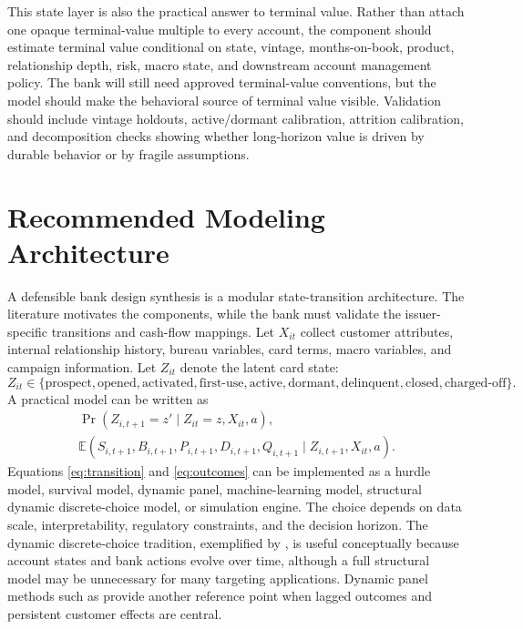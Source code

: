 \documentclass[11pt]{article}
\newcommand{\E}{\mathbb{E}}
\newcommand{\1}{\mathbf{1}}
\begin{document}
This state layer is also the practical answer to terminal value. Rather than
attach one opaque terminal-value multiple to every account, the component
should estimate terminal value conditional on state, vintage, months-on-book,
product, relationship depth, risk, macro state, and downstream account
management policy. The bank will still need approved terminal-value
conventions, but the model should make the behavioral source of terminal value
visible. Validation should include vintage holdouts, active/dormant calibration,
attrition calibration, and decomposition checks showing whether long-horizon
value is driven by durable behavior or by fragile assumptions.

\section{Recommended Modeling Architecture}
\label{sec:architecture}

A defensible bank design synthesis is a modular state-transition architecture.
The literature motivates the components, while the bank must validate the
issuer-specific transitions and cash-flow mappings. Let $X_{it}$
collect customer attributes, internal relationship history, bureau variables,
card terms, macro variables, and campaign information. Let $Z_{it}$ denote the
latent card state:
\[
  Z_{it} \in
  \{\text{prospect},\text{opened},\text{activated},\text{first-use},
    \text{active},\text{dormant},\text{delinquent},\text{closed},
    \text{charged-off}\}.
\]
A practical model can be written as
\begin{align}
  \Pr(Z_{i,t+1}=z' \mid Z_{it}=z, X_{it}, a), \label{eq:transition}\\
  \E(S_{i,t+1},B_{i,t+1},P_{i,t+1},D_{i,t+1},Q_{i,t+1}
      \mid Z_{i,t+1},X_{it},a). \label{eq:outcomes}
\end{align}
Equations \eqref{eq:transition} and \eqref{eq:outcomes} can be implemented as a
hurdle model, survival model, dynamic panel, machine-learning model, structural
dynamic discrete-choice model, or simulation engine. The choice depends on data
scale, interpretability, regulatory constraints, and the decision horizon. The
dynamic discrete-choice tradition, exemplified by \citet{rust1987replacement},
is useful conceptually because account states and bank actions evolve over time,
although a full structural model may be unnecessary for many targeting
applications. Dynamic panel methods such as \citet{blundell1998initial} provide
another reference point when lagged outcomes and persistent customer effects are
central.
\end{document}
